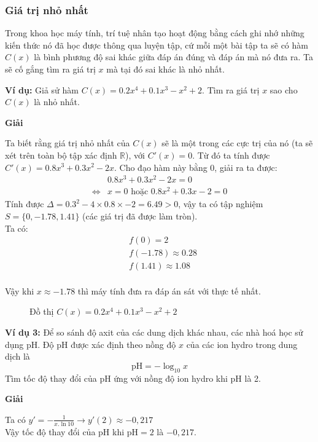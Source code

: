 \documentclass[13pt]{article}
\begin{document}
\subsubsection{Giá trị nhỏ nhất}
\par Trong khoa học máy tính, trí tuệ nhân tạo hoạt động bằng cách ghi nhớ những kiến thức nó đã học được thông qua luyện tập, cứ mỗi một bài tập ta sẽ có hàm $C(x)$ là bình phương độ sai khác giữa đáp án đúng và đáp án mà nó đưa ra. Ta sẽ cố gắng tìm ra giá trị $x$ mà tại đó sai khác là nhỏ nhất.\newline
\par\textbf{Ví dụ:} Giả sử hàm $C(x)=0.2x^4+0.1x^3-x^2+2$. Tìm ra giá trị $x$ sao cho $C(x)$ là nhỏ nhất.\newline
\centerline{\textbf{Giải}}\newline
Ta biết rằng giá trị nhỏ nhất của $C(x)$ sẽ là một trong các cực trị của nó (ta sẽ xét trên toàn bộ tập xác định $\mathbb{R}$), với $C'(x)=0$. Từ đó ta tính được $C'(x)=0.8x^3+0.3x^2-2x$. Cho đạo hàm này bằng 0, giải ra ta được:
\begin{align*}
    &0.8x^3+0.3x^2-2x=0\\
    \Leftrightarrow & x=0\text{ hoặc } 0.8x^2+0.3x-2=0
\end{align*}
Tính được $\Delta=0.3^2-4\times0.8\times-2=6.49>0$, vậy ta có tập nghiệm $S=\{0,-1.78,1.41\}$ (các giá trị đã được làm tròn).\\Ta có:
\begin{align*}
    &f(0)=2\\
    &f(-1.78)\approx0.28\\
    &f(1.41)\approx1.08
\end{align*}
\\
Vậy khi $x\approx-1.78$ thì máy tính đưa ra đáp án sát với thực tế nhất.\\
\begin{figure}
    \caption{Đồ thị $C(x)=0.2x^4+0.1x^3-x^2+2$}
    \begin{center}
    \end{center}
\end{figure}
\par\textbf{Ví dụ 3:} Để so sánh độ axit của các dung dịch khác nhau, các nhà hoá học sử dụng pH. Độ pH được xác định theo nồng độ $x$ của các ion hydro trong dung dịch là $$\text{pH}=-\log_{10}x$$
Tìm tốc độ thay đổi của pH ứng với nồng độ ion hydro khi pH là 2.\\
\centerline{\textbf{Giải}}\newline
Ta có $y'=-\frac{1}{x.\ln10}\rightarrow y'(2)\approx-0,217$\\
Vậy tốc độ thay đổi của pH khi $\text{pH}=2$ là $-0,217$.
\end{document}
